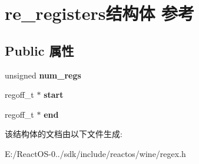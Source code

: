 \hypertarget{structre__registers}{}\section{re\+\_\+registers结构体 参考}
\label{structre__registers}
\subsection*{Public 属性}
\begin{DoxyCompactItemize}
\item 
\mbox{\label{structre__registers_aeae8140aadf339f6fe0c49277d6aa7b5}} 
unsigned {\bfseries num\+\_\+regs}
\item 
\mbox{\label{structre__registers_a6676ddb6ab07e50191e149b04dbcfe03}} 
regoff\+\_\+t $\ast$ {\bfseries start}
\item 
\mbox{\label{structre__registers_a0a9d373f1ab74c9c2063f233476fa5d4}} 
regoff\+\_\+t $\ast$ {\bfseries end}
\end{DoxyCompactItemize}


该结构体的文档由以下文件生成\+:\begin{DoxyCompactItemize}
\item 
E\+:/\+React\+O\+S-\/0../sdk/include/reactos/wine/regex.\+h\end{DoxyCompactItemize}
